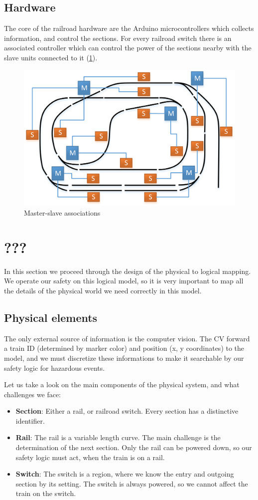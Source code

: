 \subsection{Hardware}
The core of the railroad hardware are the Arduino microcontrollers which collects information, and control the sections. For every railroad switch there is an associated controller which can control the power of the sections nearby with the slave units connected to it (\cref{fig:case_study:master_slave}).

\begin{figure}[h]
	\centering
	\includegraphics[width=0.8\linewidth]{include/figures/chapter_6/railroad_ms}
	\caption{Master-slave associations}
	\label{fig:case_study:master_slave}
\end{figure}

\section{???}
In this section we proceed through the design of the physical to logical mapping. We operate our safety on this logical model, so it is very important to map all the details of the physical world we need correctly in this model.

\subsection{Physical elements}
The only external source of information is the computer vision. The CV forward a train ID (determined by marker color) and position (x, y coordinates) to the model, and we must discretize these informations to make it searchable by our safety logic for hazardous events.

Let us take a look on the main components of the physical system, and what challenges we face:
\begin{itemize}
	\item \textbf{Section}: Either a rail, or railroad switch. Every section has a distinctive identifier.
	\item \textbf{Rail}: The rail is a variable length curve. The main challenge is the determination of the next section. Only the rail can be powered down, so our safety logic must act, when the train is on a rail.
	\item \textbf{Switch}: The switch is a region, where we know the entry and outgoing section by its setting. The switch is always powered, so we cannot affect the train on the switch.
\end{itemize}

